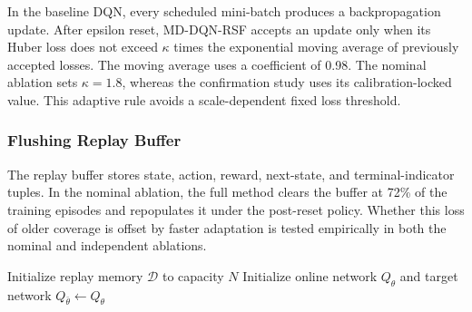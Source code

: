 \documentclass[lettersize,journal]{IEEEtran}
\begin{document}
In the baseline DQN, every scheduled mini-batch produces a backpropagation update. After epsilon reset, MD-DQN-RSF accepts an update only when its Huber loss does not exceed $\kappa$ times the exponential moving average of previously accepted losses. The moving average uses a coefficient of 0.98. The nominal ablation sets $\kappa=1.8$, whereas the confirmation study uses its calibration-locked value. This adaptive rule avoids a scale-dependent fixed loss threshold.

\subsubsection{Flushing Replay Buffer}

The replay buffer stores state, action, reward, next-state, and terminal-indicator tuples. In the nominal ablation, the full method clears the buffer at 72\% of the training episodes and repopulates it under the post-reset policy. Whether this loss of older coverage is offset by faster adaptation is tested empirically in both the nominal and independent ablations.


\begin{algorithm}
\caption{MD-DQN-RSF}
\label{alg:md-dqn-rsf}
\SetAlgoLined

Initialize replay memory $\mathcal{D}$ to capacity $N$\;
Initialize online network $Q_{\theta}$ and target network $Q_{\bar{\theta}}\leftarrow Q_{\theta}$\;

\end{algorithm}
\end{document}
